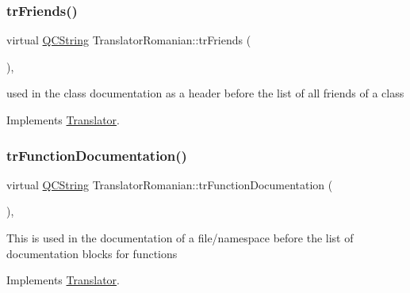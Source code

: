 \mbox{\label{class_translator_romanian_aa7771b4c38eb1eccb8b98c51a0d2ba59}} 
\subsubsection{\texorpdfstring{trFriends()}{trFriends()}}
{\footnotesize\ttfamily virtual \mbox{\hyperlink{class_q_c_string}{Q\+C\+String}} Translator\+Romanian\+::tr\+Friends (\begin{DoxyParamCaption}{ }\end{DoxyParamCaption})\hspace{0.3cm}{\ttfamily [inline]}, {\ttfamily [virtual]}}

used in the class documentation as a header before the list of all friends of a class 

Implements \mbox{\hyperlink{class_translator}{Translator}}.

\mbox{\label{class_translator_romanian_aff0dc01d02525a3d12eb37461c53dee1}} 
\subsubsection{\texorpdfstring{trFunctionDocumentation()}{trFunctionDocumentation()}}
{\footnotesize\ttfamily virtual \mbox{\hyperlink{class_q_c_string}{Q\+C\+String}} Translator\+Romanian\+::tr\+Function\+Documentation (\begin{DoxyParamCaption}{ }\end{DoxyParamCaption})\hspace{0.3cm}{\ttfamily [inline]}, {\ttfamily [virtual]}}

This is used in the documentation of a file/namespace before the list of documentation blocks for functions 

Implements \mbox{\hyperlink{class_translator}{Translator}}.

\mbox{\label{class_translator_romanian_ab9c7ce776750bb2d60f6112e2b732ced}} 
